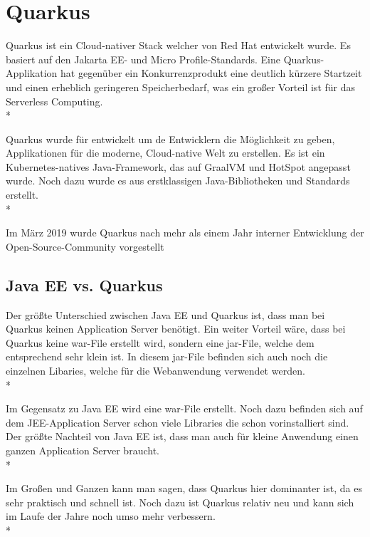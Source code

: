 \cite{JavaEE}

\section{Quarkus}
\author{David Ignjatovic} 

Quarkus ist ein Cloud-nativer Stack welcher von Red Hat entwickelt wurde. Es basiert auf den Jakarta EE- und Micro Profile-Standards. 
Eine Quarkus-Applikation hat gegenüber ein Konkurrenzprodukt eine deutlich kürzere Startzeit und einen erheblich geringeren Speicherbedarf, was ein großer Vorteil ist für das Serverless Computing.  \cite{Quarkus} \\*

Quarkus wurde für entwickelt um de Entwicklern die Möglichkeit zu geben, Applikationen für die moderne, Cloud-native Welt zu erstellen. 
Es ist ein Kubernetes-natives Java-Framework, das auf GraalVM und HotSpot angepasst wurde. Noch dazu wurde es aus erstklassigen Java-Bibliotheken und Standards erstellt. \\*   

Im März 2019 wurde Quarkus nach mehr als einem Jahr interner Entwicklung der Open-Source-Community vorgestellt

\subsection{Java EE vs. Quarkus}
\author{David Ignjatovic} 

Der größte Unterschied zwischen Java EE und Quarkus ist, dass man bei Quarkus keinen Application Server benötigt. 
Ein weiter Vorteil wäre, dass bei Quarkus keine war-File erstellt wird, sondern eine jar-File, welche dem entsprechend sehr klein ist. 
In diesem jar-File befinden sich auch noch die einzelnen Libaries, welche für die Webanwendung verwendet werden. \\*

Im Gegensatz zu Java EE wird eine war-File erstellt. Noch dazu befinden sich auf dem JEE-Application Server schon viele Libraries die schon vorinstalliert sind. 
Der größte Nachteil von Java EE ist, dass man auch für kleine Anwendung einen ganzen Application Server braucht. \\*

Im Großen und Ganzen kann man sagen, dass Quarkus hier dominanter ist, da es sehr praktisch und schnell ist. 
Noch dazu ist Quarkus relativ neu und kann sich im Laufe der Jahre noch umso mehr verbessern. \\*

